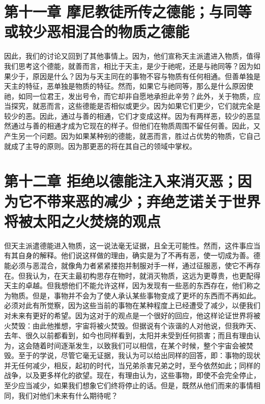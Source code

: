 
\section{第十一章 摩尼教徒所传之德能；与同等或较少恶相混合的物质之德能}

因此，我们的讨论又回到了其他事情上。因为，他们宣称天主派遣进入物质，值得我们思考这个德能，就善而言，相比于天主，是少于祂呢，还是与祂同等？因为如果少于，原因是什么？因为与天主同在的事物不容与物质有任何相通。但善单独是天主的特征，恶单独是物质的特征。然而，如果它与祂同等，那么是什么原因使祂，如同一位君王，发出号令，而它却非自愿地承担此辛劳？此外，关于物质，应当探究，就恶而言，这些德能是否相似或更少。因为如果它们更少，它们就完全是较少的恶。因此，通过与善的相通，它们才变成这样。因为有两样恶，较少的恶显然通过与善的相通才成为它现在的样子。但他们在物质周围不留任何善。因此，又产生另一个问题。因为如果某种别的德能，就恶而言，胜过占优势的物质，它自己就成了主导的原则。因为那更恶的将在其自己的领域中掌权。\par


\section{第十二章 拒绝以德能注入来消灭恶；因为它不带来恶的减少；弃绝芝诺关于世界将被太阳之火焚烧的观点}

但天主派遣德能进入物质，这一说法毫无证据，且全无可能性。然而，这件事应当有其自身的解释。他们说这样做的理由，确实是为了不再有恶，使一切成为善。德能必须与恶混合，就像角力者紧紧搂抱并制服对手一样，通过征服恶，使它不再存在。但我认为，在天主最初构思存在物时，就消灭物质，这远为更尊贵，也更配得天主的卓越。但我想他们不能允许这样，因为发现有一些恶的东西存在，他们称之为物质。但是，事物并不会为了使人承认某些事物变成了更坏的东西而不再如此。必须对此有所觉察，因为这些当前的事物在某种程度上已经遭受了减少，以便我们对未来有更好的希望。因为这对于的观点是一个很好的回应，他这样论证世界将被火焚毁：由此他推想，宇宙将被火焚毁。但据说有个诙谐的人对他说，但我昨天、去年、很久以前都看到，如今也同样看到，太阳并未受到任何损害；而且有理由认为，这会随着时间逐渐发生，以致我们可以相信，在某个时候，整个宇宙会被焚毁。至于的学说，尽管它毫无证据，我认为可以给出同样的回答，即：事物的现状并无任何减少，相反，起初的时代，当兄弟杀害兄弟之时，至今依然如此；同样的战争，以及更多样化的欲望。现在，有理由认为，这些事物，即使不会完全停止，至少应当减少，如果我们想象它们终将停止的话。但是，既然从他们而来的事情相同，我们对他们未来有什么期待呢？\par

